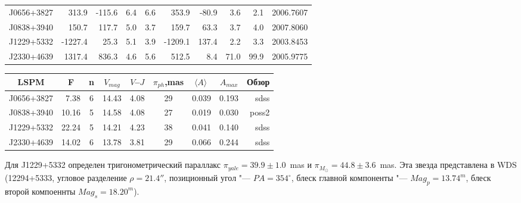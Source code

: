 \begin{table}[t]
\begin{tabularx}{\textwidth}{l|r|r|r|r|r|r|r|r|c}
J0656+3827&   313.9& -115.6& 6.4& 6.6&   353.9& -80.9&  3.6&  2.1& 2006.7607\\
J0838+3940&   150.7&  117.7& 5.0& 3.7&   159.7&  63.3&  3.7&  4.0& 2007.8060\\
J1229+5332& -1227.4&   25.3& 5.1& 3.9& -1209.1& 137.4&  2.2&  3.3& 2003.8453\\
J2330+4639&  1317.4&  836.3& 4.6& 5.6&   512.5&   8.4& 71.0& 99.9& 2005.9775\\ \hline
\end{tabularx}
\begin{tabularx}{\textwidth}{c|r|c|c|c|c|c|c|r} %

LSPM &\multicolumn{1}{c|}{F} & n & $V_{mag}$ &{\small$V$--$J$}&$\pi_{ph}$,mas&$\langle A\rangle\ $& $A_{max}$&\multicolumn{1}{c}{Обзор}\\ \hline

J0656+3827&    7.38& 6 &  14.43&   4.08&  29&0.039 &0.193& sdss\\
J0838+3940&   10.16& 5 &  14.58&   4.08&  27&0.019 &0.030&poss2\\
J1229+5332&   22.24& 5 &  14.21&   4.23&  38&0.041 &0.140& sdss\\
J2330+4639&   14.02& 6 &  13.78&   3.81&  29&0.066 &0.244& sdss\\ \hline
\end{tabularx}         	  
\begin{flushleft}
\footnotesize 
Для J1229+5332 определен тригонометрический параллакс $\pi_{yale}=39.9\pm1.0$~mas и $\pi_{M_{\odot}}=44.8\pm3.6$~mas.
Эта звезда представлена в WDS (12294+5333, угловое разделение $\rho=21.4''$, позиционный угол "--- $PA=354^{\circ}$, блеск главной компоненты "--- $Mag_p = 13.74^m$, блеск второй компоеннты $Mag_s = 18.20^m$).
\end{flushleft}
\end{table}